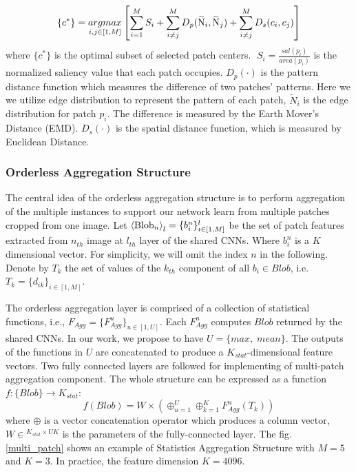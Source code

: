 \documentclass[10pt,twocolumn,letterpaper]{article}
\begin{document}
\[\{ {c^ * }\}  = \mathop {argmax}\limits_{i,j \in [1,M]} \left[ {\sum\limits_{i = 1}^M {{S_i}}  + \sum\limits_{i \ne j}^M {{D_p}({{\widetilde {\rm N}}_i},{{\widetilde {\rm N}}_j}) + \sum\limits_{i \ne j}^M {{D_s}({c_i},{c_j})} } } \right]\]
where $\{ {c^ * }\} $ is the optimal subset of selected patch centers. $\;{S_i} = \frac{{sal({p_i})}}{{area({p_i})}}$ is the normalized saliency value that 
each patch occupies. ${D_p}( \cdot )$ is the pattern distance function which 
measures the difference of two patches' patterns. Here we we utilize 
edge distribution to represent the pattern of each patch, ${{\tilde N}_i}$ 
is the edge distribution for patch $p_i$. The difference is measured by the 
Earth Mover's Distance (EMD). ${D_s}( \cdot )$ is the spatial distance function, which is measured by Euclidean Distance.

\subsubsection{Orderless Aggregation Structure}
The central idea of the orderless aggregation structure is to perform 
aggregation of the multiple instances to support our network learn from multiple patches cropped from one image.
Let ${\left\langle {{\rm{Blo}}{{\rm{b}}_n}} \right\rangle _{l}} = \{ b_i^n\} _{i \in [1,M]}^{l}$ be the set of patch features extracted from $n_{th}$ image 
at $l_{th}$ layer of the shared CNNs. Where $b_i^n$ is a $K$ dimensional vector.
For simplicity, we will omit the index $n$ in the following. 
Denote by $T_k$ the set of values
of the $k_{th}$ component of all ${b_i} \in Blob$, i.e. ${T_k} = {\{ {d_{ik}}\} _{i \in [1,M]}}$.

The orderless aggregation layer is comprised of a collection of statistical functions, 
i.e., ${F_{Agg}} = {\{ F_{Agg}^u\} _{u \in [1,U]}}$. Each $F_{Agg}^u$ computes
$Blob$ returned by the shared CNNs. In our work, we propose to have $U = \{ max,\;mean\} $. 
The outputs of the functions in $U$ are concatenated to produce a ${K_{stat}}$-dimensional feature vectors. Two fully connected layers are followed for implementing of multi-patch
aggregation component. The whole structure can be expressed as a function 
$f:\{ Blob\}  \to {{{K_{stat}}}}$:
\[f(Blob) = W \times ( \oplus _{u = 1}^U \oplus _{k = 1}^KF_{Agg}^u({T_k}))\]
where $ \oplus$ is a vector concatenation operator which produces a column vector, $W \in {^{{K_{stat}} \times UK}}$ is the parameters of the fully-connected layer. 
The fig. \ref{multi_patch} shows an example of Statistics Aggregation Structure with $M = 5$ and $K=3$. In practice, the feature dimension $K=4096$.
\end{document}
